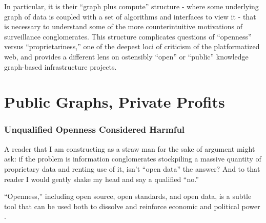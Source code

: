 In particular, it is their ``graph plus compute'' structure - where some
underlying graph of data is coupled with a set of algorithms and
interfaces to view it - that is necessary to understand some of the more
counterintuitive motivations of surveillance conglomerates. This
structure complicates questions of ``openness'' versus
``proprietariness,'' one of the deepest loci of criticism of the
platformatized web, and provides a different lens on ostensibly ``open''
or ``public'' knowledge graph-based infrastructure projects.

\hypertarget{public-graphs-private-profits}{%
\section{Public Graphs, Private
Profits}\label{public-graphs-private-profits}}

\hypertarget{unqualified-openness-considered-harmful}{%
\subsubsection{Unqualified Openness Considered
Harmful}\label{unqualified-openness-considered-harmful}}

A reader that I am constructing as a straw man for the sake of argument
might ask: if the problem is information conglomerates stockpiling a
massive quantity of proprietary data and renting use of it, isn't ``open
data'' the answer? And to that reader I would gently shake my head and
say a qualified ``no.''

``Openness,'' including open source, open standards, and open data, is a
subtle tool that can be used both to dissolve and reinforce economic and
political power \cite{bowkerSortingThingsOut1999} .

